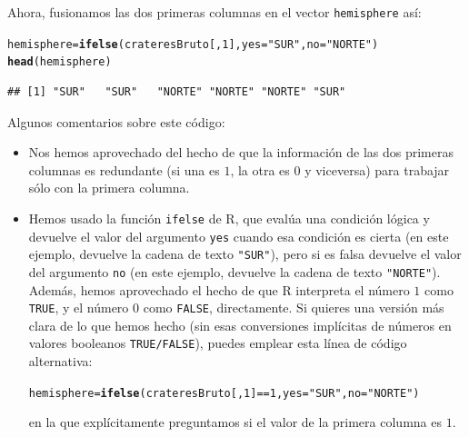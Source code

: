 \documentclass[10pt,a4paper]{article}\usepackage[]{graphicx}\usepackage[]{color}
\makeatletter
\newcommand{\hlnum}[1]{\textcolor[rgb]{0.686,0.059,0.569}{#1}}%
\newcommand{\hlstr}[1]{\textcolor[rgb]{0.192,0.494,0.8}{#1}}%
\newcommand{\hlopt}[1]{\textcolor[rgb]{0,0,0}{#1}}%
\newcommand{\hlstd}[1]{\textcolor[rgb]{0.345,0.345,0.345}{#1}}%
\newcommand{\hlkwb}[1]{\textcolor[rgb]{0.69,0.353,0.396}{#1}}%
\newcommand{\hlkwc}[1]{\textcolor[rgb]{0.333,0.667,0.333}{#1}}%
\newcommand{\hlkwd}[1]{\textcolor[rgb]{0.737,0.353,0.396}{\textbf{#1}}}%
\newenvironment{kframe}{%
 \def\at@end@of@kframe{}%
 \ifinner\ifhmode%
  \def\at@end@of@kframe{\end{minipage}}%
  \begin{minipage}{\columnwidth}%
 \fi\fi%
 \def\FrameCommand##1{\hskip\@totalleftmargin \hskip-\fboxsep
 \colorbox{shadecolor}{##1}\hskip-\fboxsep
     \hskip-\linewidth \hskip-\@totalleftmargin \hskip\columnwidth}%
 \MakeFramed {\advance\hsize-\width
   \@totalleftmargin\z@ \linewidth\hsize
   \@setminipage}}%
 {\par\unskip\endMakeFramed%
 \at@end@of@kframe}
\newenvironment{knitrout}{}{} %
\makeatother
\begin{document}
Ahora, fusionamos las dos primeras columnas en el vector {\tt hemisphere} así:

\begin{knitrout}
\color{fgcolor}\begin{kframe}
\begin{alltt}
\hlstd{hemisphere} \hlkwb{=} \hlkwd{ifelse}\hlstd{(crateresBruto[ ,}\hlnum{1}\hlstd{],} \hlkwc{yes} \hlstd{=} \hlstr{"SUR"}\hlstd{,} \hlkwc{no} \hlstd{=} \hlstr{"NORTE"}\hlstd{)}
\hlkwd{head}\hlstd{(hemisphere)}
\end{alltt}
\begin{verbatim}
## [1] "SUR"   "SUR"   "NORTE" "NORTE" "NORTE" "SUR"
\end{verbatim}
\end{kframe}
\end{knitrout}

Algunos comentarios sobre  este código:
\begin{itemize}
  \item Nos hemos aprovechado del hecho de que la información de las dos primeras columnas es redundante (si una es $1$, la otra es $0$ y viceversa) para trabajar sólo con la primera columna.
  \item Hemos usado la función {\tt ifelse} de R, que evalúa una condición lógica y devuelve el valor del argumento {\tt yes} cuando esa condición es cierta (en este ejemplo, devuelve la cadena de texto \verb#"SUR"#), pero si es falsa  devuelve el valor del argumento {\tt no} (en este ejemplo, devuelve la cadena de texto \verb#"NORTE"#). Además, hemos aprovechado el hecho de que R interpreta el número $1$ como {\tt TRUE}, y el número $0$ como {\tt FALSE}, directamente. Si quieres una versión más clara de lo que hemos hecho (sin esas conversiones implícitas de números en valores booleanos {\tt TRUE/FALSE}), puedes emplear esta línea de código alternativa:
\begin{knitrout}
\color{fgcolor}\begin{kframe}
\begin{alltt}
       \hlstd{hemisphere} \hlkwb{=} \hlkwd{ifelse}\hlstd{( crateresBruto[,}\hlnum{1}\hlstd{]} \hlopt{==} \hlnum{1}\hlstd{,} \hlkwc{yes} \hlstd{=} \hlstr{"SUR"}\hlstd{,} \hlkwc{no} \hlstd{=} \hlstr{"NORTE"}\hlstd{)}
\end{alltt}
\end{kframe}
\end{knitrout}
en la que explícitamente preguntamos si el valor de la primera columna es $1$.
\end{itemize}
\end{document}
